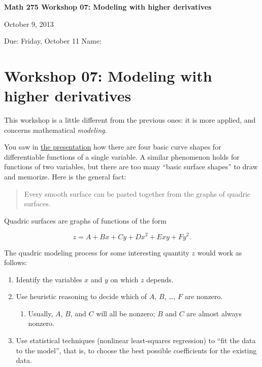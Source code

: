 \documentclass[12pt]{exam}
\theoremstyle{definition}
\begin{document}
\noindent
\textbf{{\large Math 275 \hfill Workshop 07: Modeling with higher derivatives}}

\noindent
October 9, 2013 

\noindent
Due: Friday, October 11 \hfill Name: \underline{\hspace{3in}} 

\noindent

\section{Workshop 07: Modeling with higher derivatives}

This workshop is a little different from the previous ones: it is more
applied, and concerns mathematical \emph{modeling}.

You saw in \href{../../decks/08/Deck.pdf}{the presentation} how there
are four basic curve shapes for differentiable functions of a single
variable. A similar phenomenon holds for functions of two variables, but
there are too many ``basic surface shapes'' to draw and memorize. Here
is the general fact:

\begin{quote}
Every smooth surface can be pasted together from the graphs of quadric
surfaces.
\end{quote}

Quadric surfaces are graphs of functions of the form

\[z = A + Bx + Cy + Dx^2 + Exy + Fy^2.\]

The quadric modeling process for some interesting quantity $z$ would
work as follows:

\begin{enumerate}
\def\labelenumi{\arabic{enumi}.}
\itemsep1pt\parskip0pt
\item
  Identify the variables $x$ and $y$ on which $z$ depends.
\item
  Use heuristic reasoning to decide which of $A$, $B$, \ldots{}, $F$ are
  nonzero.

  \begin{enumerate}
  \def\labelenumii{\alph{enumii}.}
  \itemsep1pt\parskip0pt
  \item
    Usually, $A$, $B$, and $C$ will all be nonzero; $B$ and $C$ are
    almost always nonzero.
  \end{enumerate}
\item
  Use statistical techniques (nonlinear least-squares regression) to
  ``fit the data to the model'', that is, to choose the best possible
  coefficients for the existing data.
\end{enumerate}
\end{document}
